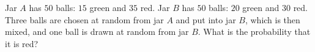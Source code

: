 Jar $A$ has $50$ balls: $15$ green and $35$ red. Jar $B$ has $50$ balls: $20$ green and $30$ red. Three balls are chosen at random from jar $A$ and put into jar $B$, which is then mixed, and one ball is drawn at random from jar $B$. What is the probability that it is red?

